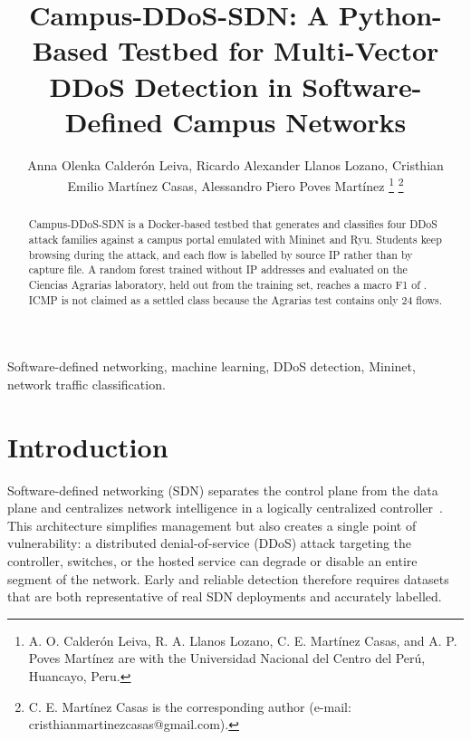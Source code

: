 \documentclass[lettersize,journal]{IEEEtran}
\begin{document}
\title{Campus-DDoS-SDN: A Python-Based Testbed for Multi-Vector DDoS Detection in Software-Defined Campus Networks}

\author{Anna Olenka Calder\'on Leiva,
        Ricardo Alexander Llanos Lozano,
        Cristhian Emilio Mart\'inez Casas,
        Alessandro Piero Poves Mart\'inez
\thanks{A. O. Calder\'on Leiva, R. A. Llanos Lozano, C. E. Mart\'inez Casas, and A. P. Poves Mart\'inez are with the Universidad Nacional del Centro del Per\'u, Huancayo, Peru.}
\thanks{C. E. Mart\'inez Casas is the corresponding author (e-mail: cristhianmartinezcasas@gmail.com).}}


\maketitle

\begin{abstract}
Campus-DDoS-SDN is a Docker-based testbed that generates and classifies four DDoS attack families against a campus portal emulated with Mininet and Ryu. Students keep browsing during the attack, and each flow is labelled by source IP rather than by capture file. A random forest trained without IP addresses and evaluated on the Ciencias Agrarias laboratory, held out from the training set, reaches a macro F1 of \Fmacro.  ICMP is not claimed as a settled class because the Agrarias test contains only 24 flows.
\end{abstract}

\begin{IEEEkeywords}
Software-defined networking, machine learning, DDoS detection, Mininet, network traffic classification.
\end{IEEEkeywords}

\section{Introduction}
Software-defined networking (SDN) separates the control plane from the data plane and centralizes network intelligence in a logically centralized controller~\cite{kreutz2015sdn}. This architecture simplifies management but also creates a single point of vulnerability: a distributed denial-of-service (DDoS) attack targeting the controller, switches, or the hosted service can degrade or disable an entire segment of the network. Early and reliable detection therefore requires datasets that are both representative of real SDN deployments and accurately labelled.
\end{document}
